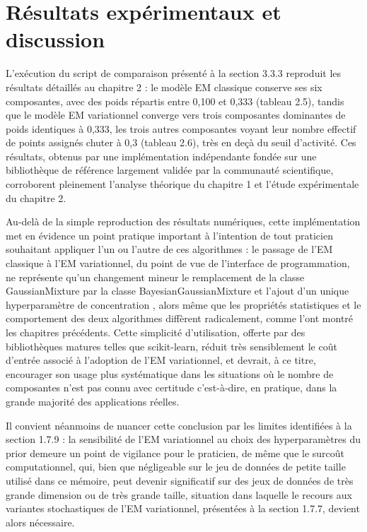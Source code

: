 \section{Résultats expérimentaux et discussion}
L'exécution du script de comparaison présenté à la section 3.3.3 reproduit les résultats détaillés au chapitre 2 : le modèle EM classique conserve ses six composantes, avec des poids répartis entre 0,100 et 0,333 (tableau 2.5), tandis que le modèle EM variationnel converge vers trois composantes dominantes de poids identiques à 0,333, les trois autres composantes voyant leur nombre effectif de points assignés chuter à 0,3 (tableau 2.6), très en deçà du seuil d'activité. Ces résultats, obtenus par une implémentation indépendante fondée sur une bibliothèque de référence largement validée par la communauté scientifique, corroborent pleinement l'analyse théorique du chapitre 1 et l'étude expérimentale du chapitre 2.

Au-delà de la simple reproduction des résultats numériques, cette implémentation met en évidence un point pratique important à l'intention de tout praticien souhaitant appliquer l'un ou l'autre de ces algorithmes : le passage de l'EM classique à l'EM variationnel, du point de vue de l'interface de programmation, ne représente qu'un changement mineur  le remplacement de la classe GaussianMixture par la classe BayesianGaussianMixture et l'ajout d'un unique hyperparamètre de concentration , alors même que les propriétés statistiques et le comportement des deux algorithmes diffèrent radicalement, comme l'ont montré les chapitres précédents. Cette simplicité d'utilisation, offerte par des bibliothèques matures telles que scikit-learn, réduit très sensiblement le coût d'entrée associé à l'adoption de l'EM variationnel, et devrait, à ce titre, encourager son usage plus systématique dans les situations où le nombre de composantes n'est pas connu avec certitude  c'est-à-dire, en pratique, dans la grande majorité des applications réelles.

Il convient néanmoins de nuancer cette conclusion par les limites identifiées à la section 1.7.9 : la sensibilité de l'EM variationnel au choix des hyperparamètres du prior demeure un point de vigilance pour le praticien, de même que le surcoût computationnel, qui, bien que négligeable sur le jeu de données de petite taille utilisé dans ce mémoire, peut devenir significatif sur des jeux de données de très grande dimension ou de très grande taille, situation dans laquelle le recours aux variantes stochastiques de l'EM variationnel, présentées à la section 1.7.7, devient alors nécessaire.

